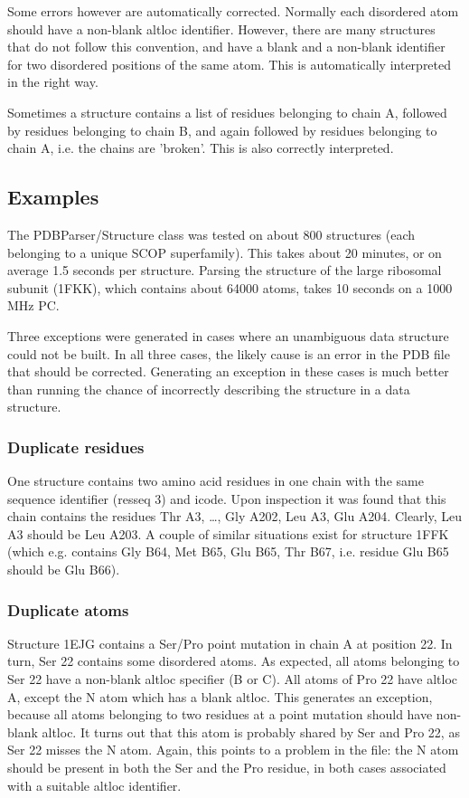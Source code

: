 Some errors however are automatically corrected. Normally each disordered
atom should have a non-blank altloc identifier. However, there are
many structures that do not follow this convention, and have a blank
and a non-blank identifier for two disordered positions of the same
atom. This is automatically interpreted in the right way.

Sometimes a structure contains a list of residues belonging to chain
A, followed by residues belonging to chain B, and again followed by
residues belonging to chain A, i.e. the chains are 'broken'. This
is also correctly interpreted.

\subsection{Examples\label{problem structures}}

The PDBParser/Structure class was tested on about 800 structures (each belonging
to a unique SCOP superfamily). This takes about 20 minutes, or on average 1.5
seconds per structure. Parsing the structure of the large ribosomal subunit
(1FKK), which contains about 64000 atoms, takes 10 seconds on a 1000 MHz PC.

Three exceptions were generated in cases where an unambiguous data structure
could not be built. In all three cases, the likely cause is an error in the
PDB file that should be corrected. Generating an exception in these cases
is much better than running the chance of incorrectly describing
the structure in a data structure.

\subsubsection{Duplicate residues}

One structure contains two amino acid residues in one chain with the same sequence
identifier (resseq 3) and icode. Upon inspection it was found that this chain
contains the residues Thr A3, \ldots, Gly A202, Leu A3, Glu A204. Clearly,
Leu A3 should be Leu A203. A couple of similar situations exist for structure
1FFK (which e.g. contains Gly B64, Met B65, Glu B65, Thr B67, i.e. residue Glu
B65 should be Glu B66).

\subsubsection{Duplicate atoms}

Structure 1EJG contains a Ser/Pro point mutation in chain A at position 22.
In turn, Ser 22 contains some disordered atoms. As expected, all atoms belonging
to Ser 22 have a non-blank altloc specifier (B or C). All atoms of Pro 22 have
altloc A, except the N atom which has a blank altloc. This generates an exception,
because all atoms belonging to two residues at a point mutation should have
non-blank altloc. It turns out that this atom is probably shared by Ser and
Pro 22, as Ser 22 misses the N atom. Again, this points to a problem in the
file: the N atom should be present in both the Ser and the Pro residue, in both
cases associated with a suitable altloc identifier.

